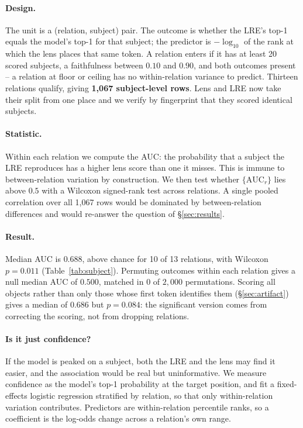 \paragraph{Design.} The unit is a (relation, subject) pair. The outcome is
whether the LRE's top-1 equals the model's top-1 for that subject; the
predictor is $-\log_{10}$ of the rank at which the lens places that same
token. A relation enters if it has at least 20 scored subjects, a
faithfulness between $0.10$ and $0.90$, and both outcomes present -- a
relation at floor or ceiling has no within-relation variance to predict.
Thirteen relations qualify, giving \textbf{1{,}067 subject-level rows}.
Lens and LRE now take their split from one place and we verify by
fingerprint that they scored identical subjects.

\paragraph{Statistic.} Within each relation we compute the AUC: the
probability that a subject the LRE reproduces has a higher lens score than
one it misses. This is immune to between-relation variation by
construction. We then test whether $\{\mathrm{AUC}_r\}$ lies above $0.5$
with a Wilcoxon signed-rank test across relations. A single pooled
correlation over all 1{,}067 rows would be dominated by between-relation
differences and would re-answer the question of \S\ref{sec:results}.



\paragraph{Result.} Median AUC is $\mathbf{0.688}$, above chance for
10 of 13 relations, with Wilcoxon $p = 0.011$ (Table~\ref{tab:subject}).
Permuting outcomes within each relation gives a null median AUC of
$0.500$, matched in $0$ of $2{,}000$ permutations. Scoring all objects
rather than only those whose first token identifies them
(\S\ref{sec:artifact}) gives a median of $0.686$ but $p = 0.084$: the
significant version comes from correcting the scoring, not from dropping
relations.

\paragraph{Is it just confidence?}
\label{par:conf}
If the model is peaked on a subject, both the LRE and the lens may find it
easier, and the association would be real but uninformative. We measure
confidence as the model's top-1 probability at the target position, and
fit a fixed-effects logistic regression stratified by relation, so that
only within-relation variation contributes. Predictors are within-relation
percentile ranks, so a coefficient is the log-odds change across a
relation's own range.

